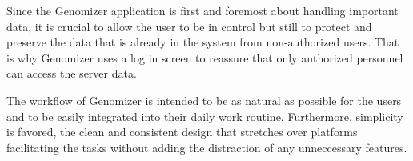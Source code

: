 Since the Genomizer application is first and foremost about handling important 
data, it is crucial to allow the user to be in control but still to protect 
and preserve the data that is already in the system from non-authorized users.
That is why Genomizer uses a log in screen to reassure that only authorized 
personnel can access the server data.

The workflow of Genomizer is intended to be as natural as possible for 
the users and to be easily integrated into their daily work routine.
Furthermore, simplicity is favored, the clean and consistent design
that stretches over platforms 
facilitating the tasks without adding the distraction of any 
unneccessary features.

